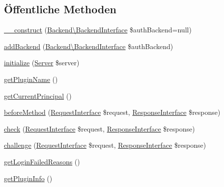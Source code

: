 \subsection*{Öffentliche Methoden}
\begin{DoxyCompactItemize}
\item 
\mbox{\hyperlink{class_sabre_1_1_d_a_v_1_1_auth_1_1_plugin_a1b5e2afac682f6b5a6e0c676ef6bb597}{\+\_\+\+\_\+construct}} (\mbox{\hyperlink{interface_sabre_1_1_d_a_v_1_1_auth_1_1_backend_1_1_backend_interface}{Backend\textbackslash{}\+Backend\+Interface}} \$auth\+Backend=null)
\item 
\mbox{\hyperlink{class_sabre_1_1_d_a_v_1_1_auth_1_1_plugin_a846ed4fb5b949a03bf3f98d8100e3059}{add\+Backend}} (\mbox{\hyperlink{interface_sabre_1_1_d_a_v_1_1_auth_1_1_backend_1_1_backend_interface}{Backend\textbackslash{}\+Backend\+Interface}} \$auth\+Backend)
\item 
\mbox{\hyperlink{class_sabre_1_1_d_a_v_1_1_auth_1_1_plugin_a2bce3a74a48f0c4f1bc3301fb2b619d1}{initialize}} (\mbox{\hyperlink{class_sabre_1_1_d_a_v_1_1_server}{Server}} \$server)
\item 
\mbox{\hyperlink{class_sabre_1_1_d_a_v_1_1_auth_1_1_plugin_a903a5c08cd4ed94be8469c5f872b6f65}{get\+Plugin\+Name}} ()
\item 
\mbox{\hyperlink{class_sabre_1_1_d_a_v_1_1_auth_1_1_plugin_a218a29b372e6b413fcb9ee632b206734}{get\+Current\+Principal}} ()
\item 
\mbox{\hyperlink{class_sabre_1_1_d_a_v_1_1_auth_1_1_plugin_a82bf49257f655c8d35789c7538843485}{before\+Method}} (\mbox{\hyperlink{interface_sabre_1_1_h_t_t_p_1_1_request_interface}{Request\+Interface}} \$request, \mbox{\hyperlink{interface_sabre_1_1_h_t_t_p_1_1_response_interface}{Response\+Interface}} \$response)
\item 
\mbox{\hyperlink{class_sabre_1_1_d_a_v_1_1_auth_1_1_plugin_a8e6772b5d633a755b0e1ed81d0ea89e6}{check}} (\mbox{\hyperlink{interface_sabre_1_1_h_t_t_p_1_1_request_interface}{Request\+Interface}} \$request, \mbox{\hyperlink{interface_sabre_1_1_h_t_t_p_1_1_response_interface}{Response\+Interface}} \$response)
\item 
\mbox{\hyperlink{class_sabre_1_1_d_a_v_1_1_auth_1_1_plugin_afcb46d2853c7dd4121fe587af1a7334d}{challenge}} (\mbox{\hyperlink{interface_sabre_1_1_h_t_t_p_1_1_request_interface}{Request\+Interface}} \$request, \mbox{\hyperlink{interface_sabre_1_1_h_t_t_p_1_1_response_interface}{Response\+Interface}} \$response)
\item 
\mbox{\hyperlink{class_sabre_1_1_d_a_v_1_1_auth_1_1_plugin_a7517785241c5bba0a97a78cc21475038}{get\+Login\+Failed\+Reasons}} ()
\item 
\mbox{\hyperlink{class_sabre_1_1_d_a_v_1_1_auth_1_1_plugin_a814681021297509c4bdd0d6fa8578960}{get\+Plugin\+Info}} ()
\end{DoxyCompactItemize}
